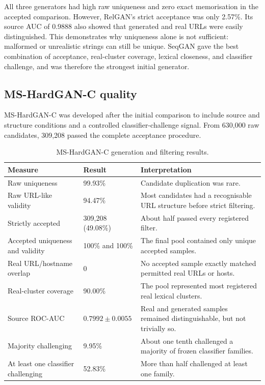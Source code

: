 All three generators had high raw uniqueness and zero exact memorisation in
the accepted comparison. However, RelGAN's strict acceptance was only 2.57\%.
Its source AUC of 0.9888 also showed that generated and real URLs were easily
distinguished. This demonstrates why uniqueness alone is not sufficient:
malformed or unrealistic strings can still be unique. SeqGAN gave the best
combination of acceptance, real-cluster coverage, lexical closeness, and
classifier challenge, and was therefore the strongest initial generator.

\subsection{MS-HardGAN-C quality}

MS-HardGAN-C was developed after the initial comparison to include source and
structure conditions and a controlled classifier-challenge signal. From
630,000 raw candidates, 309,208 passed the complete acceptance procedure.

\begin{table}[htbp]
\centering
\caption{MS-HardGAN-C generation and filtering results.}
\label{tab:hardgan-quality}
\small
\begin{tabular}{@{}p{}p{}p{}@{}}
\toprule
Measure & Result & Interpretation \\
\midrule
Raw uniqueness & 99.93\% & Candidate duplication was rare. \\
Raw URL-like validity & 94.47\% & Most candidates had a recognisable URL structure before strict filtering. \\
Strictly accepted & 309,208 (49.08\%) & About half passed every registered filter. \\
Accepted uniqueness and validity & 100\% and 100\% & The final pool contained only unique accepted samples. \\
Real URL/hostname overlap & 0 & No accepted sample exactly matched permitted real URLs or hosts. \\
Real-cluster coverage & 90.00\% & The pool represented most registered real lexical clusters. \\
Source ROC-AUC & $0.7992\pm0.0055$ & Real and generated samples remained distinguishable, but not trivially so. \\
Majority challenging & 9.95\% & About one tenth challenged a majority of frozen classifier families. \\
At least one classifier challenging & 52.83\% & More than half challenged at least one family. \\
\bottomrule
\end{tabular}
\end{table}

